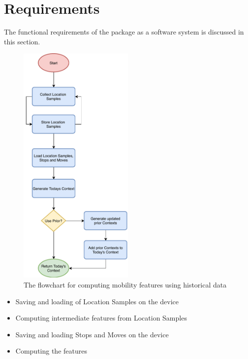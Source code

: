 \section{Requirements}
The functional requirements of the package as a software system is discussed in this section. 
\begin{figure}
    \centering
    \includegraphics[width=0.5\textwidth]{images/diagrams/api-flowchart.pdf}
    \caption{The flowchart for computing mobility features using historical data}
    \label{fig:flowchart-features}
\end{figure}

\begin{itemize}
    \item Saving and loading of Location Samples on the device
    \item Computing intermediate features from Location Samples
    \item Saving and loading Stops and Moves on the device
    \item Computing the features
\end{itemize}

